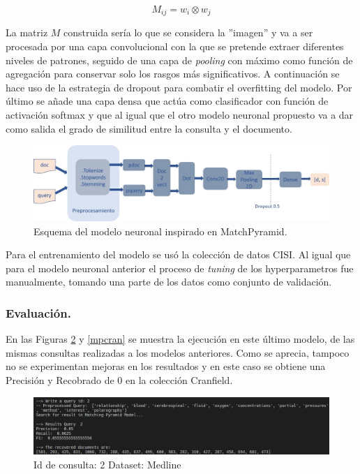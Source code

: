 \documentclass{llncs}
\begin{document}
 \begin{equation}
 \label{eq1}
 M_{ij} = w_i \otimes w_j
 \end{equation} 
  
 La matriz $M$ construida sería lo que se considera la ''imagen'' y va a ser procesada por una capa convolucional con la que se pretende extraer diferentes niveles de patrones, seguido de una capa de \textit{pooling} con máximo como función de agregación para conservar solo los rasgos más significativos. A continuación se hace uso de la estrategia de dropout para combatir el overfitting del modelo. Por último se añade una capa densa que actúa como clasificador con función de activación softmax y que al igual que el otro modelo neuronal propuesto va a dar como salida el grado de similitud entre la consulta y el documento. 

\begin{figure}
	\begin{center}
		\includegraphics[width=\linewidth]{ ./images/match.jpg}
		\caption{Esquema del modelo neuronal inspirado en MatchPyramid.}
		\label{matchpyramid}
	\end{center}
\end{figure}

Para el entrenamiento del modelo se usó la colección de datos CISI. Al igual que para el modelo neuronal anterior el proceso de \textit{tuning} de los hyperparametros fue manualmente, tomando una parte de los datos como conjunto de validación.

\subsubsection{Evaluación.}
En las Figuras \ref{mpmed} y \ref{mpcran} se muestra la ejecución en este último modelo, de las mismas consultas realizadas a los modelos anteriores. Como se aprecia, tampoco no se experimentan mejoras en los resultados y en este caso se obtiene una Precisión y Recobrado de 0 en la colección Cranfield.

  
\begin{figure}
	\begin{center}
		\includegraphics[width=\linewidth]{ ./images/mpmed.png}
		\caption{ Id de consulta: 2 Dataset: Medline }
		\label{mpmed}
	\end{center}
\end{figure}
\end{document}
